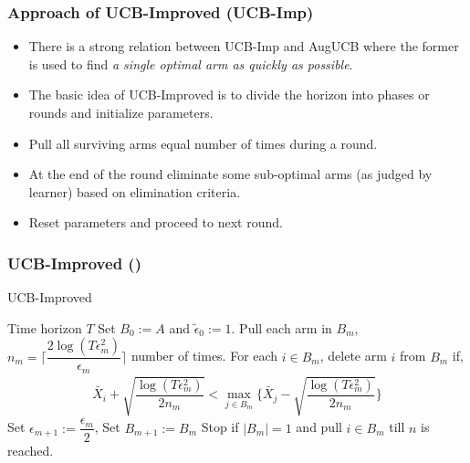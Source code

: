 \begin{frame}
\frametitle{Approach of UCB-Improved (UCB-Imp)}
\begin{itemize}
\item<1-> There is a strong relation between UCB-Imp and AugUCB where the former is used to find \emph{a single optimal arm as quickly as possible}.
\item<2-> The basic idea of UCB-Improved is to divide the horizon into phases or rounds and initialize parameters.
\item<3-> Pull all surviving arms equal number of times during a round.
\item<4-> At the end of the round eliminate some sub-optimal arms (as judged by learner) based on elimination criteria.
\item<5-> Reset parameters and proceed to next round.
\end{itemize}
\end{frame}

\begin{frame}
\frametitle{UCB-Improved (\cite{auer2010ucb})}
\begin{algorithm}[H]
\caption{UCB-Improved}
\small
\begin{algorithmic}[1]
 Time horizon $T$
 Set $B_{0}:=A$ and $\tilde{\epsilon}_{0}:=1$.
\State Pull each arm in $B_m$, $n_{m}=\bigg\lceil\dfrac{2\log{( T{\epsilon}_{m}^{2})}}{{\epsilon}_{m}}\bigg\rceil$ number of times.
\ArmElim
\State For each $i \in B_{m}$, delete arm ${i}$ from $B_{m}$ if,
\begin{align*}
\bar{X}_{i} + \sqrt{\dfrac{\log{(T{\epsilon}_{m}^{2})}}{2 n_{m}}}  < \max_{{j}\in B_{m}}\bigg\lbrace\bar{X}_{j} -\sqrt{\dfrac{\log{( T{\epsilon}_{m}^{2})}}{2 n_{m}}} \bigg\rbrace
\end{align*}
\EndArmElim
\State Set ${\epsilon}_{m+1}:=\dfrac{{\epsilon}_{m}}{2}$, Set $B_{m+1}:=B_{m}$
\State Stop if $|B_{m}|=1$ and pull ${i}\in B_{m}$ till $n$ is reached.
\EndFor
\end{algorithmic}
\end{algorithm}
\end{frame}

